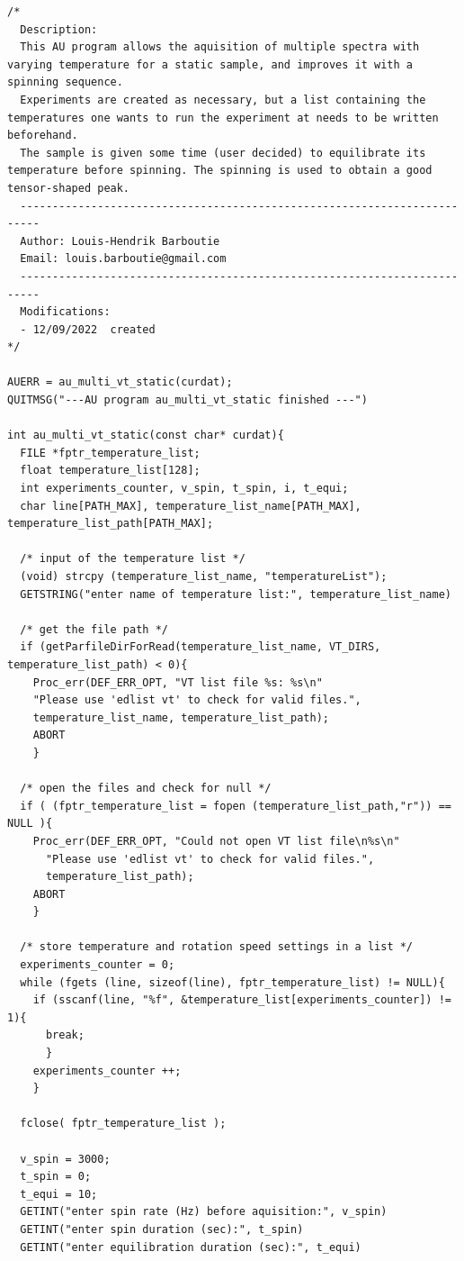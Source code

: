 \documentclass[12pt]{article}
\begin{document}
\begin{verbatim}
/*
  Description:
  This AU program allows the aquisition of multiple spectra with varying temperature for a static sample, and improves it with a spinning sequence.
  Experiments are created as necessary, but a list containing the temperatures one wants to run the experiment at needs to be written beforehand.
  The sample is given some time (user decided) to equilibrate its temperature before spinning. The spinning is used to obtain a good tensor-shaped peak.
  -------------------------------------------------------------------------
  Author: Louis-Hendrik Barboutie
  Email: louis.barboutie@gmail.com
  -------------------------------------------------------------------------
  Modifications:
  - 12/09/2022  created
*/

AUERR = au_multi_vt_static(curdat);
QUITMSG("---AU program au_multi_vt_static finished ---")

int au_multi_vt_static(const char* curdat){
  FILE *fptr_temperature_list;
  float temperature_list[128];
  int experiments_counter, v_spin, t_spin, i, t_equi;
  char line[PATH_MAX], temperature_list_name[PATH_MAX], temperature_list_path[PATH_MAX];

  /* input of the temperature list */
  (void) strcpy (temperature_list_name, "temperatureList");
  GETSTRING("enter name of temperature list:", temperature_list_name)
		
  /* get the file path */
  if (getParfileDirForRead(temperature_list_name, VT_DIRS, temperature_list_path) < 0){
    Proc_err(DEF_ERR_OPT, "VT list file %s: %s\n"
	"Please use 'edlist vt' to check for valid files.",
	temperature_list_name, temperature_list_path);
    ABORT
    }

  /* open the files and check for null */
  if ( (fptr_temperature_list = fopen (temperature_list_path,"r")) == NULL ){
    Proc_err(DEF_ERR_OPT, "Could not open VT list file\n%s\n"
	  "Please use 'edlist vt' to check for valid files.",
	  temperature_list_path);
    ABORT
    }	
  	
  /* store temperature and rotation speed settings in a list */
  experiments_counter = 0;
  while (fgets (line, sizeof(line), fptr_temperature_list) != NULL){
    if (sscanf(line, "%f", &temperature_list[experiments_counter]) != 1){
      break; 
      }
    experiments_counter ++;
    }
		
  fclose( fptr_temperature_list );

  v_spin = 3000;
  t_spin = 0;
  t_equi = 10;
  GETINT("enter spin rate (Hz) before aquisition:", v_spin)
  GETINT("enter spin duration (sec):", t_spin)
  GETINT("enter equilibration duration (sec):", t_equi)


\end{verbatim}
\end{document}
